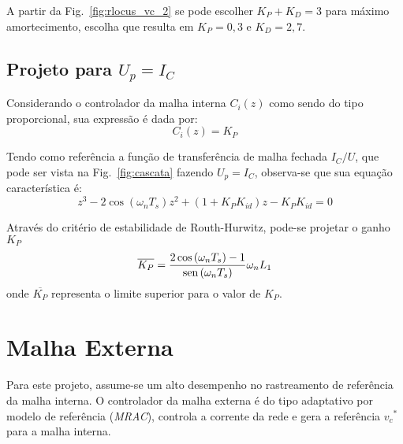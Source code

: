     A partir da Fig.~\ref{fig:rlocus_vc_2} se pode escolher $K_P+K_D = 3$ para máximo amortecimento,
    escolha que resulta em $K_P = 0,3$ e $K_D = 2,7$.


\subsection{Projeto para $U_p = I_C$}

    Considerando o controlador da malha interna $C_i(z)$ como sendo do tipo proporcional, sua
    expressão é dada por:
    \begin{equation}
        C_i(z) = K_P
    \end{equation}

    Tendo como referência a função de transferência de malha fechada $I_C/U$, que pode ser vista
    na Fig.~\ref{fig:cascata} fazendo $U_p = I_C$, observa-se que sua equação característica é:
    \begin{equation}
        z^3 - 2 \cos \left( \omega_n T_s \right) z^2 + \left( 1 + K_P K_{id} \right) z -
            K_P K_{id} = 0
    \end{equation}

    Através do critério de estabilidade de Routh-Hurwitz, pode-se projetar o ganho $K_P$
    \begin{equation}
        \overline{K_P} = \frac{2 \cos \left( \omega_n T_s \right) - 1}
            {\operatorname{sen} \left( \omega_n T_s \right)} \omega_n L_1
    \end{equation}
    onde $\overline{K_P}$ representa o limite superior para o valor de $K_P$.


\section{Malha Externa}

    Para este projeto, assume-se um alto desempenho no rastreamento de referência
    da malha interna. O controlador da malha externa é do tipo adaptativo por modelo
    de referência (\emph{MRAC}), controla a corrente da rede e gera a referência
    ${v_c}^*$ para a malha interna.

